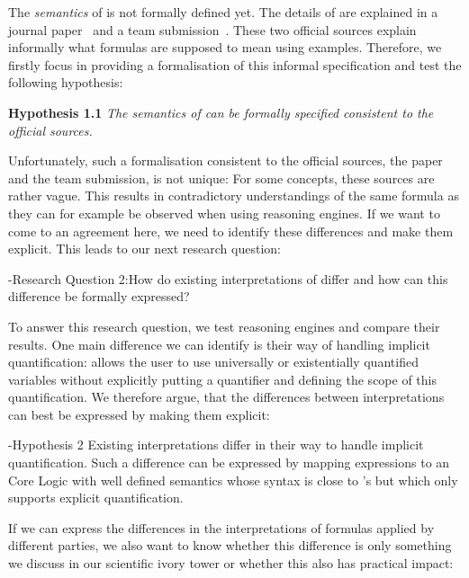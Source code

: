 The \emph{semantics} of \nthree is not formally defined yet. The details of \nthreelogic 
are explained in a journal paper~\cite{N3Logic} and a \wwwc team submission~\cite{Notation3}. 
These two official sources explain informally what \nthree formulas are supposed to mean using examples.  Therefore, we firstly focus in providing a formalisation of this informal specification and test the following hypothesis:

\textbf{Hypothesis 1.1} \textit{The semantics of  \nthreelogic can be formally specified consistent to the official sources.}

Unfortunately, such a formalisation consistent to the official sources, the paper and the \wwwc team submission,  is not unique:
For some concepts, these sources are rather vague. This results in contradictory understandings of the same formula as they can for example be observed 
when using \nthree reasoning engines.
If we want to come to an agreement here, we need to identify these differences and make them explicit. This leads to our next research question:

\hyp{Research Question 2:}{How do existing interpretations of \nthree differ and how can this difference be formally expressed?}

To answer this research question, we test reasoning engines and compare their results. One main difference we can identify is their way of handling 
implicit quantification: \nthreelogic allows the user to use universally or existentially quantified variables 
without explicitly putting a quantifier and defining the scope of this quantification. We therefore argue, that the differences between interpretations can best be expressed 
by making them explicit:


\hyp{Hypothesis 2}{ Existing interpretations differ in their way to handle implicit quantification. 
Such a difference can be expressed by mapping \nthree expressions to an \nthree Core Logic  with well defined semantics
whose syntax is close to \nthree's but which only supports explicit quantification.}

% 
% 
If we can express the differences in the interpretations of \nthree formulas applied by different parties, we also want to know whether this difference is only something we discuss 
in our scientific ivory tower or whether this also has practical impact:

